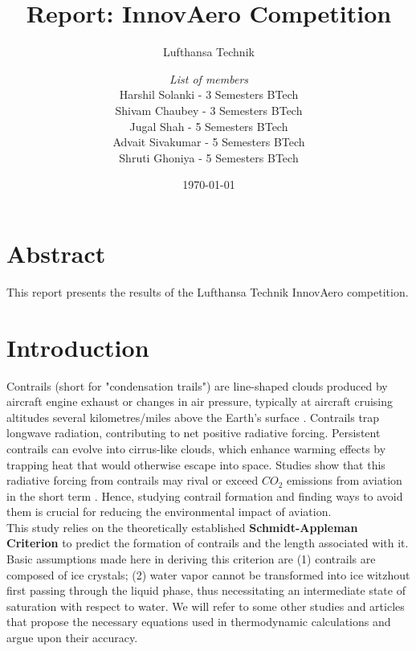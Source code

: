 \documentclass[a4paper, 12pt]{report}
\institute{{\bfseries\Huge Team Rakshak}\\\vspace{10pt}Indian Institute of Technology Bombay}
\title{Report: InnovAero Competition}
\subtitle{Lufthansa Technik}
\author{\textit{List of members}\\
        Harshil Solanki - 3 Semesters BTech\\
        Shivam Chaubey - 3 Semesters BTech\\
        Jugal Shah - 5 Semesters BTech\\
        Advait Sivakumar - 5 Semesters BTech\\
        Shruti Ghoniya - 5 Semesters BTech
}
\date{\today}
\begin{document}
\maketitle
\romantableofcontents

\chapter{Abstract}
This report presents the results of the Lufthansa Technik InnovAero competition.

\chapter{Introduction}
Contrails (short for "condensation trails") are line-shaped clouds produced by aircraft engine exhaust or changes in air pressure, typically at aircraft cruising altitudes several kilometres/miles above the Earth's surface \cite{enwiki:1250066651}. Contrails trap longwave radiation, contributing to net positive radiative forcing. Persistent contrails can evolve into cirrus-like clouds, which enhance warming effects by trapping heat that would otherwise escape into space. Studies show that this radiative forcing from contrails may rival or exceed $CO_2$ emissions from aviation in the short term \cite{acp}. Hence, studying contrail formation and finding ways to avoid them is crucial for reducing the environmental impact of aviation. \\

This study relies on the theoretically established \textbf{Schmidt-Appleman Criterion} \cite{appleman1953formation} to predict the formation of contrails and the length associated with it. Basic assumptions made here in deriving this criterion are (1) contrails are composed of ice crystals; (2) water vapor cannot
be transformed into ice witzhout first passing through the liquid phase, thus necessitating an
intermediate state of saturation with respect to water. We will refer to some other studies and articles that propose the necessary equations used in thermodynamic calculations and argue upon their accuracy. \\
\end{document}
